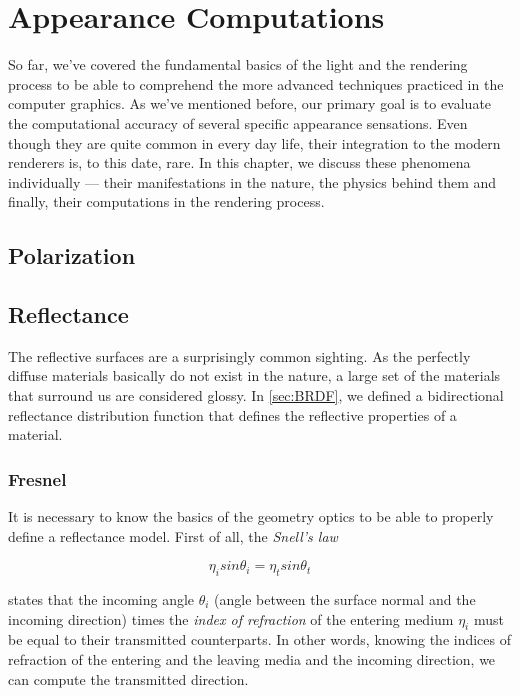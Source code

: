 \chapter{Appearance Computations}
\label{chap:appearance}

So far, we've covered the fundamental basics of the light and the rendering process to be able to comprehend the more advanced techniques practiced in the computer graphics. As we've mentioned before, our primary goal is to evaluate the computational accuracy of several specific appearance sensations. Even though they are quite common in every day life, their integration to the modern renderers is, to this date, rare.  In this chapter, we discuss these phenomena individually --- their manifestations in the nature, the physics behind them and finally, their computations in the rendering process. 

\section{Polarization}
\label{sec:polarization}



\section{Reflectance}

The reflective surfaces are a surprisingly common sighting. As the perfectly diffuse materials basically do not exist in the nature, a large set of the materials that surround us are considered glossy. In \autoref{sec:BRDF}, we defined a bidirectional reflectance distribution function that defines the reflective properties of a material. 

\subsection{Fresnel}

It is necessary to know the basics of the geometry optics to be able to properly define a reflectance model. First of all, the \emph{Snell's law}~\cite{pharr2016physically}

\begin{equation}
\eta_i sin\theta_i = \eta_t sin\theta_t 
\end{equation}

states that the incoming angle $\theta_i$ (angle between the surface normal and the incoming direction) times the \emph{index of refraction} of the entering medium $\eta_i$ must be equal to their transmitted counterparts. In other words, knowing the indices of refraction of the entering and the leaving media and the incoming direction, we can compute the transmitted direction.

